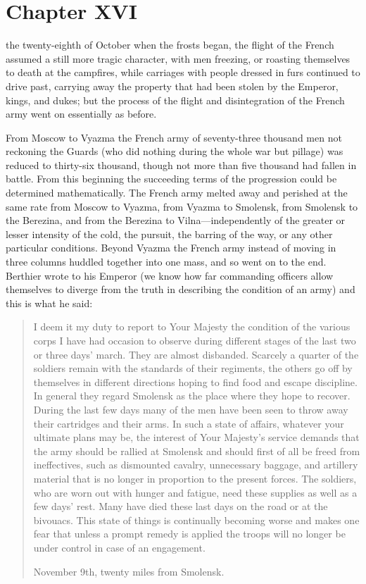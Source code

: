 \chapter*{Chapter XVI} \ifaudio {}
\fi

 the twenty-eighth of October when the frosts began, the
flight of the French assumed a still more tragic character, with
men freezing, or roasting themselves to death at the campfires,
while carriages with people dressed in furs continued to drive
past, carrying away the property that had been stolen by the
Emperor, kings, and dukes; but the process of the flight and
disintegration of the French army went on essentially as before.

From Moscow to Vyazma the French army of seventy-three thousand
men not reckoning the Guards (who did nothing during the whole
war but pillage) was reduced to thirty-six thousand, though not
more than five thousand had fallen in battle. From this beginning
the succeeding terms of the progression could be determined
mathematically. The French army melted away and perished at the
same rate from Moscow to Vyazma, from Vyazma to Smolensk, from
Smolensk to the Berezina, and from the Berezina to
Vilna---independently of the greater or lesser intensity of the
cold, the pursuit, the barring of the way, or any other
particular conditions.  Beyond Vyazma the French army instead of
moving in three columns huddled together into one mass, and so
went on to the end. Berthier wrote to his Emperor (we know how
far commanding officers allow themselves to diverge from the
truth in describing the condition of an army) and this is what he
said: \begin{quote}\calli I deem it my duty to report to Your
Majesty the condition of the various corps I have had occasion to
observe during different stages of the last two or three days'
march. They are almost disbanded. Scarcely a quarter of the
soldiers remain with the standards of their regiments, the others
go off by themselves in different directions hoping to find food
and escape discipline. In general they regard Smolensk as the
place where they hope to recover. During the last few days many
of the men have been seen to throw away their cartridges and
their arms. In such a state of affairs, whatever your ultimate
plans may be, the interest of Your Majesty's service demands that
the army should be rallied at Smolensk and should first of all be
freed from ineffectives, such as dismounted cavalry, unnecessary
baggage, and artillery material that is no longer in proportion
to the present forces. The soldiers, who are worn out with hunger
and fatigue, need these supplies as well as a few days' rest.
Many have died these last days on the road or at the
bivouacs. This state of things is continually becoming worse and
makes one fear that unless a prompt remedy is applied the troops
will no longer be under control in case of an engagement.

  November 9th, twenty miles from Smolensk.  \end{quote}

